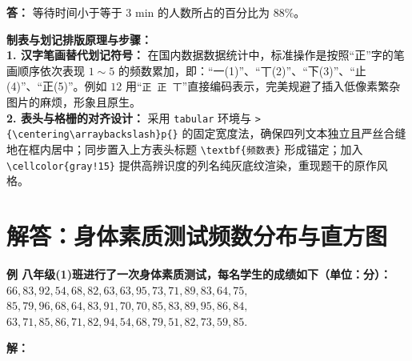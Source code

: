 \textbf{答：} 等待时间小于等于 $3\text{ min}$ 的人数所占的百分比为 $88\%$。

\vspace{0.6cm}

{\small\color{blue!70!black}
\textbf{制表与划记排版原理与步骤：}\\
\textbf{1. 汉字笔画替代划记符号：} 在国内数据数据统计中，标准操作是按照“正”字的笔画顺序依次表现 $1 \sim 5$ 的频数累加，即：“一(1)”、“丅(2)”、“下(3)”、“止(4)”、“正(5)”。例如 $12$ 用“\texttt{正~正~丅}”直接编码表示，完美规避了插入低像素繁杂图片的麻烦，形象且原生。\\
\textbf{2. 表头与格栅的对齐设计：} 采用 \texttt{tabular} 环境与 \texttt{>\{\textbackslash centering\textbackslash arraybackslash\}p\{\}} 的固定宽度法，确保四列文本独立且严丝合缝地在框内居中；同步置入上方表头标题 \texttt{\textbackslash textbf\{频数表\}} 形成锚定；加入 \texttt{\textbackslash cellcolor\{gray!15\}} 提供高辨识度的列名纯灰底纹渲染，重现题干的原作风格。
}

\newpage



\section{解答：身体素质测试频数分布与直方图}

\vspace{0.6cm}

\textbf{例 八年级(1)班进行了一次身体素质测试，每名学生的成绩如下（单位：分）：\\
$66, 83, 92, 54, 68, 82, 63, 63, 95, 73, 71, 89, 83, 64, 75,$ \\
$85, 79, 96, 68, 64, 83, 91, 70, 70, 85, 83, 89, 95, 86, 84,$ \\
$63, 71, 85, 86, 71, 82, 94, 54, 68, 79, 51, 82, 73, 59, 85.$}

\vspace{0.4cm}

\textbf{解：}

